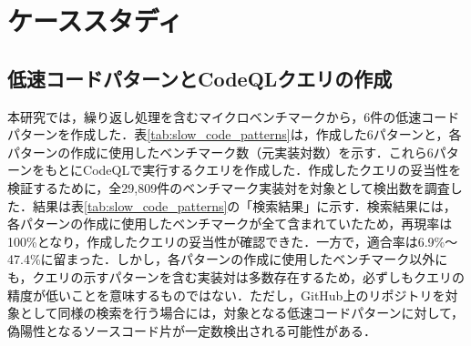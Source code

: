 \documentclass[submit,techrep,noauthor]{ipsj}
\begin{document}
\section{ケーススタディ}
\label{sec:case-study}

\subsection{低速コードパターンとCodeQLクエリの作成}
\label{subsection:pattern}

本研究では，繰り返し処理を含むマイクロベンチマークから，6件の低速コードパターンを作成した．表\ref{tab:slow_code_patterns}は，作成した6パターンと，各パターンの作成に使用したベンチマーク数（元実装対数）を示す．これら6パターンをもとにCodeQLで実行するクエリを作成した．作成したクエリの妥当性を検証するために，全29,809件のベンチマーク実装対を対象として検出数を調査した．結果は表\ref{tab:slow_code_patterns}の「検索結果」に示す．検索結果には，各パターンの作成に使用したベンチマークが全て含まれていたため，再現率は100\%となり，作成したクエリの妥当性が確認できた．一方で，適合率は6.9\%～47.4\%に留まった．しかし，各パターンの作成に使用したベンチマーク以外にも，クエリの示すパターンを含む実装対は多数存在するため，必ずしもクエリの精度が低いことを意味するものではない．ただし，GitHub上のリポジトリを対象として同様の検索を行う場合には，対象となる低速コードパターンに対して，偽陽性となるソースコード片が一定数検出される可能性がある．
\end{document}
